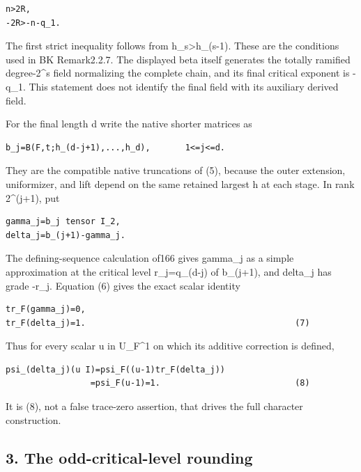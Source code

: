 \begin{Verbatim}[fontsize=\small,breaklines=true,breakanywhere=true]
n>2R,
-2R>-n-q_1.
\end{Verbatim}

The first strict inequality follows from h\_s\textgreater h\_(s-1).
These are the conditions used in BK Remark2.2.7. The displayed beta
itself generates the totally ramified degree-2\^{}s field normalizing
the complete chain, and its final critical exponent is -q\_1. This
statement does not identify the final field with its auxiliary derived
field.

For the final length d write the native shorter matrices as

\begin{Verbatim}[fontsize=\small,breaklines=true,breakanywhere=true]
b_j=B(F,t;h_(d-j+1),...,h_d),       1<=j<=d.
\end{Verbatim}

They are the compatible native truncations of (5), because the outer
extension, uniformizer, and lift depend on the same retained largest h
at each stage. In rank 2\^{}(j+1), put

\begin{Verbatim}[fontsize=\small,breaklines=true,breakanywhere=true]
gamma_j=b_j tensor I_2,
delta_j=b_(j+1)-gamma_j.
\end{Verbatim}

The defining-sequence calculation of166 gives gamma\_j as a simple
approximation at the critical level r\_j=q\_(d-j) of b\_(j+1), and
delta\_j has grade -r\_j. Equation (6) gives the exact scalar identity

\begin{Verbatim}[fontsize=\small,breaklines=true,breakanywhere=true]
tr_F(gamma_j)=0,
tr_F(delta_j)=1.                                          (7)
\end{Verbatim}

Thus for every scalar u in U\_F\^{}1 on which its additive correction is
defined,

\begin{Verbatim}[fontsize=\small,breaklines=true,breakanywhere=true]
psi_(delta_j)(u I)=psi_F((u-1)tr_F(delta_j))
                 =psi_F(u-1)=1.                           (8)
\end{Verbatim}

It is (8), not a false trace-zero assertion, that drives the full
character construction.

\hypertarget{dyadic_character-the-odd-critical-level-rounding}{%
\subsection{3. The odd-critical-level
rounding}\label{dyadic_character-the-odd-critical-level-rounding}}

